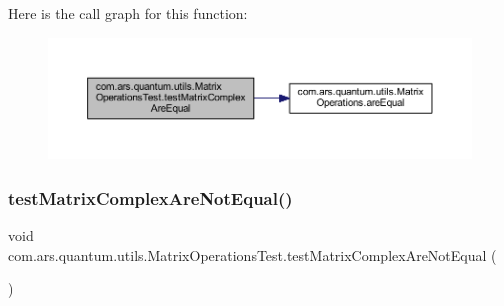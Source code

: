Here is the call graph for this function\+:\nopagebreak
\begin{figure}[H]
\begin{center}
\leavevmode
\includegraphics[width=350pt]{classcom_1_1ars_1_1quantum_1_1utils_1_1_matrix_operations_test_a1f520804726b4695d38491efb081a62f_cgraph}
\end{center}
\end{figure}
\hypertarget{classcom_1_1ars_1_1quantum_1_1utils_1_1_matrix_operations_test_a510001ff5f110f317a003aad024b7814}{}\label{classcom_1_1ars_1_1quantum_1_1utils_1_1_matrix_operations_test_a510001ff5f110f317a003aad024b7814} 
\subsubsection{\texorpdfstring{test\+Matrix\+Complex\+Are\+Not\+Equal()}{testMatrixComplexAreNotEqual()}}
{\footnotesize\ttfamily void com.\+ars.\+quantum.\+utils.\+Matrix\+Operations\+Test.\+test\+Matrix\+Complex\+Are\+Not\+Equal (\begin{DoxyParamCaption}{ }\end{DoxyParamCaption})}

